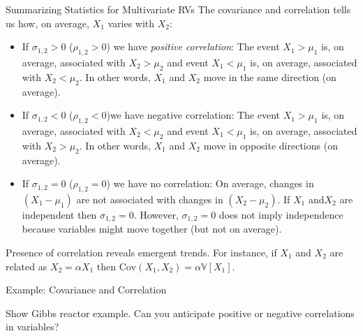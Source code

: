 \documentclass[9pt]{beamer}
\begin{document}
%
\begin{frame}{Summarizing Statistics for Multivariate RVs}
The covariance and correlation tells us how, on average, $X_1$ varies with $X_2$: 

\begin{block}{}
\begin{itemize}
\item If $\sigma_{1,2}>0$ ($\rho_{1,2}>0$) we have {\em positive correlation}: The event $X_1>\mu_1$  is, on average, associated with $X_2>\mu_2$ and event $X_1<\mu_1$  is, on average, associated with $X_2<\mu_2$.  In other words, $X_1$ and $X_2$ move in the same direction (on average).

\item If $\sigma_{1,2}<0$  ($\rho_{1,2}<0$)we have negative correlation: The event $X_1>\mu_1$  is, on average, associated with $X_2<\mu_2$ and event $X_1<\mu_1$  is, on average, associated with $X_2>\mu_2$. In other words, $X_1$ and $X_2$ move in opposite directions (on average). 

\item If $\sigma_{1,2}=0$ ($\rho_{1,2}=0$) we have no correlation: On average, changes in $(X_1-\mu_1)$ are not associated with changes in $(X_2-\mu_2)$. If $X_1$ and$X_2$ are independent then $\sigma_{1,2}=0$. However, $\sigma_{1,2}=0$ does not imply independence because variables might move together (but not on average).
\end{itemize}
\end{block}
Presence of correlation reveals emergent trends. For instance, if $X_1$ and $X_2$ are related as $X_2=\alpha X_1$ then $\textrm{Cov}(X_1,X_2)=\alpha \mathbb{V}[X_1]$. 

\end{frame}

%
\begin{frame}{Example: Covariance and Correlation}

\begin{block}{}
Show Gibbs reactor example. Can you anticipate positive or negative correlations in variables? 
\end{block}

\end{frame}
\end{document}
